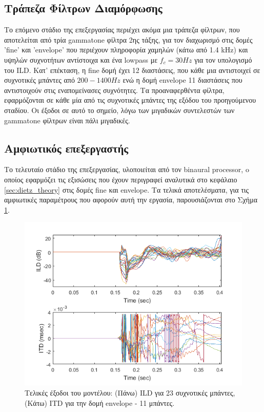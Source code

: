 \subsection{Τράπεζα Φίλτρων Διαμόρφωσης}

Το επόμενο στάδιο της επεξεργασίας περιέχει ακόμα μια τράπεζα φίλτρων, που αποτελείται από τρία gammatone φίλτρα 2ης τάξης, για τον διαχωρισμό στις δομές 'fine' και 'envelope' που περιέχουν πληροφορία χαμηλών (κάτω από 1.4 kHz) και υψηλών συχνοτήτων αντίστοιχα και ένα lowpass με $f_c = 30 Hz$ για τον υπολογισμό του ILD. Κατ' επέκταση, η fine δομή έχει 12 διαστάσεις, που κάθε μια αντιστοιχεί σε συχνοτικές μπάντες από $200-1400 Hz$ ενώ η δομή envelope 11 διαστάσεις που αντιστοιχούν στις εναπομείνασες συχνότητες. Τα προαναφερθέντα φίλτρα, εφαρμόζονται σε κάθε μία από τις συχνοτικές μπάντες της εξόδου του προηγούμενου σταδίου. Οι έξοδοι σε αυτό το σημείο, λόγω των μιγαδικών συντελεστών των gammatone φίλτρων είναι πάλι μιγαδικές.

\subsection{Αμφιωτικός επεξεργαστής}

Το τελευταίο στάδιο της επεξεργασίας, υλοποιείται από τον binaural processor, o οποίος εφαρμόζει τις εξισώσεις που έχουν περιγραφεί αναλυτικά στο κεφάλαιο \ref{sec:dietz_theory} στις δομές fine και envelope. Τα τελικά αποτελέσματα, για τις αμφιωτικές παραμέτρους που αφορούν αυτή την εργασία, παρουσιάζονται στο Σχήμα \ref{fig:dietz_out_final}.

\begin{figure}[h]
  \centering
  \includegraphics[width=\textwidth]{images/dietz_out_final.png}
  \caption{Τελικές έξοδοι του μοντέλου: (Πάνω) ILD για 23 συχνοτικές μπάντες, (Κάτω) ITD για την δομή envelope - 11 μπάντες.}
  \label{fig:dietz_out_final}
\end{figure}
